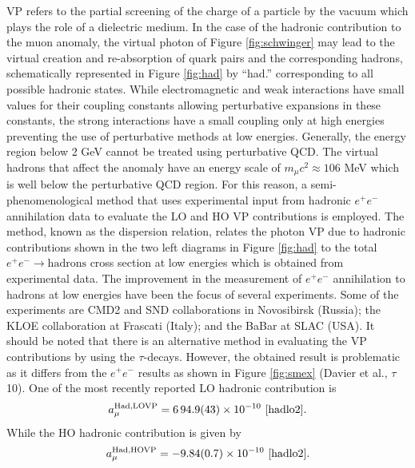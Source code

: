 \documentclass{outhesis}
\begin{document}
VP refers to the partial screening of the charge of a particle by the vacuum which plays the role of a dielectric medium. In the case of the hadronic contribution to the muon anomaly, the virtual photon of Figure \ref{fig:schwinger} may lead to the virtual creation and re-absorption of quark pairs and the corresponding hadrons, schematically represented in Figure \ref{fig:had} by ``had.'' corresponding to all possible hadronic states. While electromagnetic and weak interactions have small values for their coupling constants allowing perturbative expansions in these constants, the strong interactions have a small coupling only at high energies preventing the use of perturbative methods at low energies. Generally, the energy region below 2 GeV cannot be treated using perturbative QCD. The virtual hadrons that affect the anomaly have an energy scale of $m_{\mu}c^2 \approx 106$ MeV which is well below the perturbative QCD region. For this reason, a semi-phenomenological method that uses experimental input from hadronic $e^+e^-$ annihilation data to evaluate the LO and HO VP contributions is employed. The method, known as the dispersion relation, relates the photon VP due to hadronic contributions shown in the two left diagrams in Figure \ref{fig:had} to the total $e^+e^- \to \text{hadrons}$ cross section at low energies which is obtained from experimental data. The improvement in the measurement of $e^+e^-$ annihilation to hadrons at low energies have been the focus of several experiments. Some of the experiments are CMD2 and SND collaborations in Novosibirsk (Russia); the KLOE collaboration at Frascati (Italy); and the BaBar at SLAC (USA). It should be noted that there is an alternative method in evaluating the VP contributions by using the $\tau$-decays. However, the obtained result is problematic as it differs from the  $e^+e^-$ results as shown in Figure \ref{fig:smex} (Davier et al., $\displaystyle \tau$10).
One of the most recently reported LO hadronic contribution is %
\begin{equation}
a_{\mu}^{\text{Had,LOVP}} = 6\,94.9(43) \times 10^{-10} \,\,\cite{hadlo2}. 
\label{eq:hadlo2}
\end{equation}
While the HO hadronic contribution is given by 
\begin{equation}
a_{\mu}^{\text{Had,HOVP}} = -9.84(0.7) \times 10^{-10} \,\,\cite{hadlo2}. 
\label{eq:hadho}
\end{equation}
\end{document}
